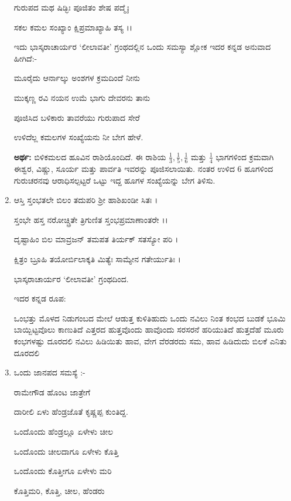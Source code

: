 \begin{enumerate}
 ಗುರುಪದ ಮಥ ಷಿಡ್ಭಿಃ ಪೂಜಿತಂ ಶೇಷ ಪದ್ಮೈಃ 
 
 ಸಕಲ ಕಮಲ ಸಂಖ್ಯಾಂ ಕ್ಷಿಪ್ರಮಾಖ್ಯಾಹಿ ತಸ್ಯ ।।
 
 \medskip
 
 ಇದು ಭಾಸ್ಕರಾಚಾರ್ಯರ ‘ಲೀಲಾವತೀ’ ಗ್ರಂಥದಲ್ಲಿನ ಒಂದು ಸಮಸ್ಯಾ ಶ್ಲೋಕ ಇದರ ಕನ್ನಡ ಅನುವಾದ ಹೀಗಿದೆ:-
 
 \smallskip
 
 ಮೂರೈದು ಆರ್ನಾಲ್ಕು ಅಂಶಗಳ ಕ್ರಮದಿಂದೆ ನೀನು
 
 ಮುಕ್ಕಣ್ಣ ರವಿ ನಯನ ಉಮೆ ಭಾಗು ದೇವರನು ತಾನು 
 
 ಪೂಜಿಸಿದ ಬಳಿಕಾರು ತಾವರೆಯು ಗುರುಪಾದ ಸೇರೆ 
 
 ಉಳಿದೆಲ್ಲ ಕಮಲಗಳ ಸಂಖ್ಯೆಯನು ನೀ ಬೇಗ ಹೇಳೆ.
 
 \smallskip
 {\bf ಅರ್ಥ:} ಬಿಳಿಕಮಲದ ಹೂವಿನ ರಾಶಿಯೊಂದಿದೆ. ಈ ರಾಶಿಯ $\frac{1}{3}, \frac{1}{5}, \frac{1}{6}$ ಮತ್ತು $\frac{1}{4}$ ಭಾಗಗಳಿಂದ ಕ್ರಮವಾಗಿ ಈಶ್ವರ, ವಿಷ್ಣು, ಸೂರ್ಯ ಮತ್ತು ಪಾರ್ವತಿ ಇವರನ್ನು ಪೂಜಿಸಲಾಯಿತು. ನಂತರ ಉಳಿದ 6 ಹೂಗಳಿಂದ ಗುರುಚರನವು ಆರಾಧಿಸಲ್ಪಟ್ಟರೆ ಒಟ್ಟು ಇದ್ದ ಹೂಗಳ ಸಂಖ್ಯೆಯನ್ನು ಬೇಗ ತಿಳಿಸು. 
 
 \eject
 
 \item ಆಸ್ತಿ ಸ್ತಂಭತಲೇ ಬಿಲಂ ತದುಪರಿ ಶ್ರೀ ಹಾಶಿಖಂಡೀ ಸಿತಃ ।
 
 ಸ್ತಂಭೇ ಹಸ್ತ ನರೋಚ್ಚ್ರಿತೇ ತ್ರಿಗುಣಿತ ಸ್ತಂಭಪ್ರಮಾಣಾಂತರೇ ।।
 
 ದೃಷ್ಟಾಹಿಂ ಬಿಲ ಮಾವ್ರಜನ್ ತಮಪತ ತಿರ್ಯಕ್ ಸತಸ್ಯೋ ಪರಿ ।
 
 ಕ್ಷಿತ್ರಂ ಬ್ರೂಹಿ ತಯೋರ್ಬಿಲಾಕ್ಕತಿ ಮಿತ್ಯೆಃ ಸಾಮ್ಯೇನ ಗತೇರ್ಯುತಿಃ ।
 
 \hfill ಭಾಸ್ಕರಾಚಾರ್ಯರ ‘ಲೀಲಾವತೀ’ ಗ್ರಂಥದಿಂದ.
  
 \smallskip
 
 ಇದರ ಕನ್ನಡ ರೂಪ:
 
 \smallskip
 
 ಒಂಭತ್ತು ಮೊಳದ ನಿಡುಗಂಬದ ಮೇಲೆ ಆಡುತ್ತ ಕುಳಿತಿಹುದು ಒಂದು ನವಿಲು ನಿಂತ ಕಂಭದ ಬುಡಕೆ ಭೂಮಿ ಬಾಯ್ಬಿಟ್ಟವೊಲು ಕಾಣುತಿದೆ ಎತ್ತರದ ಹುತ್ತವೊಂದು ಹಾವೊಂದು ಸರಸರನೆ ಹರಿಯುತಿದೆ ಹುತ್ತದೆಹೆ ಮೂರು ಕಂಭಗಳಷ್ಟು ದೂರದಲಿ ನವಿಲು ಹಿಡಿಯಿತು ಹಾವ, ವೇಗ ವೆರಡರದು ಸಮ, ಹಾವ ಹಿಡಿದುದು ಬಿಲಕೆ ಎನಿತು ದೂರದಲಿ
 
 \item ಒಂದು ಜಾನಪದ ಸಮಸ್ಯೆ :-
 
\smallskip

ರಾಮೇಗೌಡ ಹೊಂಟ ಜಾತ್ರೇಗೆ 
 
ದಾರೀಲಿ ಏಳು ಹೆಂಡ್ರಜೊತೆ ಕೃಷ್ಣಪ್ಪ ಕುಂತಿದ್ದ. 
 
ಒಂದೊಂದು ಹೆಂಡ್ರಲ್ಲೂ ಏಳೇಳು ಚೀಲ 
 
ಒಂದೊಂದು ಚೀಲದಾಗೂ ಏಳೇಳು ಕೊತ್ತಿ 
 
ಒಂದೊಂದು ಕೊತ್ತೀಗೂ ಏಳೇಳು ಮರಿ

ಕೊತ್ತಿಮರಿ, ಕೊತ್ತಿ, ಚೀಲ, ಹೆಂಡರು 


\end{enumerate}
